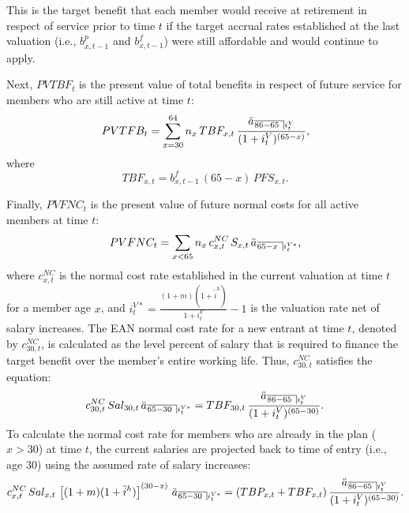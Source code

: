 \documentclass{sfuthesis}
\numberwithin{equation}{chapter}
\begin{document}
	
		\justify
		This is the target benefit that each member would receive at retirement in respect of service prior to time $t$ if the target accrual rates established at the last valuation (i.e., $b_{x,t-1}^{p}$ and $b_{x,t-1}^{f}$) were still affordable and would continue to apply.
	
	
		\justify
		Next, $PVTBF_{t}$ is the present value of total benefits in respect of future service for members who are still active at time $t$:
		\begin{equation}
		\label{eq:STBP_24}
		PVTFB_{t} = \sum_{x=30}^{64} n_{x}\, TBF_{x,t} \, \frac{\ddot{a}_{\angl{86 - 65 }i^{V}_{t}}}{(1+i^{V}_{t})^{(65-x)}},
		\end{equation}
		where
		\begin{equation}
		\label{eq:STBP_25}
		TBF_{x,t} = b_{x,t-1}^{f} \, (65-x)\,  PFS_{x,t}. 
		\end{equation}


		\justify
		Finally, $PVFNC_{t}$ is the present value of future normal costs for all active members at time $t$:
		\begin{equation}
		\label{eq:STBP_26}
		PVFNC_{t} = \sum_{x<65} n_{x} \, c_{x,t}^{NC} \, S_{x,t} \, \ddot{a}_{\angl{65-x}i_{t}^{V*}},
		\end{equation}
		where $c_{x,t}^{NC}$ is the normal cost rate established in the current valuation at time $t$ for a member age $x$, and $i_{t}^{V*} = \frac{(1+m)(1+\tilde{i}^{h})}{1+i_{t}^{V}}-1$ is the valuation rate net of salary increases. The EAN normal cost rate for a new entrant at time $t$, denoted by $c_{30,t}^{NC}$, is calculated as the level percent of salary that is required to finance the target benefit over the member's entire working life. Thus, $c_{30,t}^{NC}$ satisfies the equation:
		\begin{equation}
		\label{eq:STBP_27}
		c_{30,t}^{NC} \, Sal_{30,t} \, \ddot{a}_{\angl{65-30}i_{t}^{V*}} = TBF_{30,t} \, \frac{\ddot{a}_{\angl{86 - 65 }i^{V}_{t}}}{(1+i^{V}_{t})^{(65-30)}}.
		\end{equation}
		To calculate the normal cost rate for members who are already in the plan ($x>30$) at time $t$, the current salaries are projected back to time of entry (i.e., age $30$) using the assumed rate of salary increases: 
		\begin{equation}
		\label{eq:STBP_28}
		c_{x,t}^{NC} \, Sal_{x,t} \, \left[(1+m)(1+\tilde{i}^{h})\right]^{(30-x)} \, \ddot{a}_{\angl{65-30}i_{t}^{V*}} = (TBP_{x,t} + TBF_{x,t}) \, \frac{\ddot{a}_{\angl{86 - 65}i^{V}_{t}}}{(1+i^{V}_{t})^{(65-30)}}.
		\end{equation}
	
\end{document}
